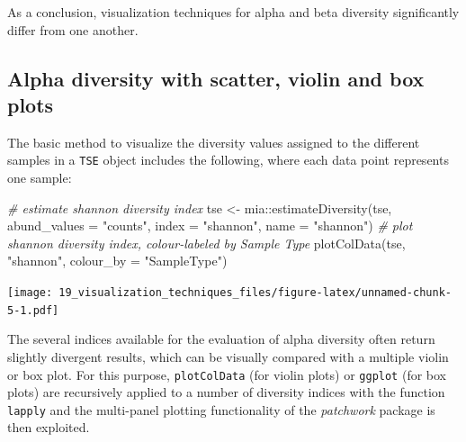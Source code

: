 \documentclass[
]{book}
\newenvironment{Shaded}{\begin{snugshade}}{\end{snugshade}}
\newcommand{\AttributeTok}[1]{\textcolor[rgb]{0.77,0.63,0.00}{#1}}
\newcommand{\CommentTok}[1]{\textcolor[rgb]{0.56,0.35,0.01}{\textit{#1}}}
\newcommand{\FunctionTok}[1]{\textcolor[rgb]{0.00,0.00,0.00}{#1}}
\newcommand{\NormalTok}[1]{#1}
\newcommand{\OtherTok}[1]{\textcolor[rgb]{0.56,0.35,0.01}{#1}}
\newcommand{\SpecialCharTok}[1]{\textcolor[rgb]{0.00,0.00,0.00}{#1}}
\newcommand{\StringTok}[1]{\textcolor[rgb]{0.31,0.60,0.02}{#1}}
\begin{document}
As a conclusion, visualization techniques for alpha and beta diversity significantly differ from one another.

\hypertarget{alpha-diversity-with-scatter-violin-and-box-plots}{%
\subsection{Alpha diversity with scatter, violin and box plots}\label{alpha-diversity-with-scatter-violin-and-box-plots}}

The basic method to visualize the diversity values assigned to the different
samples in a \texttt{TSE} object includes the following, where each data point represents one sample:

\begin{Shaded}
\begin{Highlighting}[]
\CommentTok{\# estimate shannon diversity index}
\NormalTok{tse }\OtherTok{\textless{}{-}}\NormalTok{ mia}\SpecialCharTok{::}\FunctionTok{estimateDiversity}\NormalTok{(tse, }
                              \AttributeTok{abund\_values =} \StringTok{"counts"}\NormalTok{,}
                              \AttributeTok{index =} \StringTok{"shannon"}\NormalTok{, }
                              \AttributeTok{name =} \StringTok{"shannon"}\NormalTok{)}
\CommentTok{\# plot shannon diversity index, colour{-}labeled by Sample Type}
\FunctionTok{plotColData}\NormalTok{(tse, }\StringTok{"shannon"}\NormalTok{, }\AttributeTok{colour\_by =} \StringTok{"SampleType"}\NormalTok{)}
\end{Highlighting}
\end{Shaded}

\texttt{[image: 19\_visualization\_techniques\_files/figure-latex/unnamed-chunk-5-1.pdf]}

The several indices available for the evaluation of alpha diversity often return
slightly divergent results, which can be visually compared with a multiple violin
or box plot. For this purpose, \texttt{plotColData} (for violin plots) or \texttt{ggplot}
(for box plots) are recursively applied to a number of diversity indices with
the function \texttt{lapply} and the multi-panel plotting functionality of the
\emph{patchwork} package is then exploited.
\end{document}
